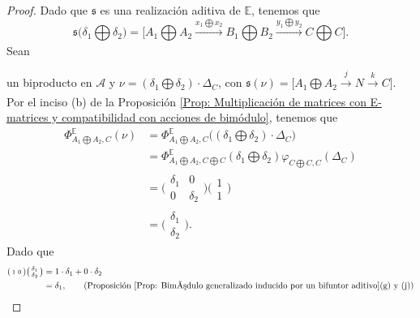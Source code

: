 \documentclass[tesis]{subfiles}
\begin{document}
\begin{proof}
    Dado que $\mathfrak{s}$ es una realización aditiva de $\mathbb{E}$, tenemos que
    \[
    \mathfrak{s}\big(\delta_1\bigoplus\delta_2\big) = \big[A_1\bigoplus A_2 \xrightarrow[]{x_1\bigoplus x_2} B_1\bigoplus B_2 \xrightarrow[]{y_1\bigoplus y_2} C\bigoplus C\big].
    \] 
    Sean  un biproducto en $\mathscr{A}$ y $\nu = (\delta_1\bigoplus\delta_2)\cdot\Delta_C$, con $\mathfrak{s}(\nu) = \big[A_1\bigoplus A_2 \xrightarrow[]{j} N\xrightarrow[]{k} C\big]$. Por el inciso (b) de la Proposición \ref{Prop: Multiplicación de matrices con E-matrices y compatibilidad con acciones de bimódulo}, tenemos que
    \begin{align*}
        \Phi^\mathbb{E}_{A_1\bigoplus A_2,C}(\nu) &= \Phi^\mathbb{E}_{A_1\bigoplus A_2, C}\big((\delta_1\bigoplus\delta_2)\cdot\Delta_C\big) \\
                                    &= \Phi^\mathbb{E}_{A_1\bigoplus A_2, C\bigoplus C}(\delta_1\bigoplus\delta_2)\varphi_{C\bigoplus C,C}(\Delta_C) \\
                                    &= \big(\begin{smallmatrix} \delta_1 &0 \\ 0 &\delta_2 \end{smallmatrix}\big)\big( \begin{smallmatrix} 1 \\ 1 \end{smallmatrix}\big) \\
                                    &= \big(\begin{smallmatrix} \delta_1 \\ \delta_2 \end{smallmatrix}\big).
    \end{align*}
    Dado que
    \begin{align*}
        (\begin{smallmatrix} 1 &0 \end{smallmatrix})\big( \begin{smallmatrix} \delta_1 \\ \delta_2 \end{smallmatrix}\big) &= 1\cdot\delta_1 + 0\cdot\delta_2 \\
                               &= \delta_1, \tag{Proposición \ref{Prop: Bimódulo generalizado inducido por un bifuntor aditivo}(g) y (j)} \\

\end{align*}
\end{proof}
\end{document}
